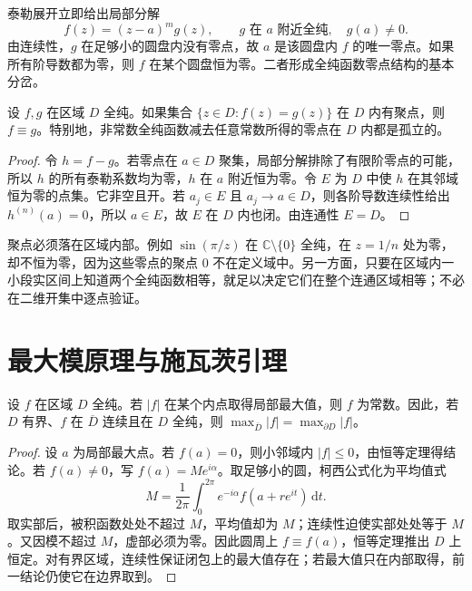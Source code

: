 泰勒展开立即给出局部分解
\begin{equation}
 f(z)=(z-a)^m g(z),\qquad g\text{ 在 }a\text{ 附近全纯},\quad g(a)\ne0.
 \label{eq:ca-zero-factor}
\end{equation}
由连续性，$g$ 在足够小的圆盘内没有零点，故 $a$ 是该圆盘内 $f$ 的唯一零点。如果所有阶导数都为零，则 $f$ 在某个圆盘恒为零。二者形成全纯函数零点结构的基本分岔。

\begin{theorem}[恒等定理]
\label{thm:ca-identity}
设 $f,g$ 在区域 $D$ 全纯。如果集合 $\{z\in D:f(z)=g(z)\}$ 在 $D$ 内有聚点，则 $f\equiv g$。特别地，非常数全纯函数减去任意常数所得的零点在 $D$ 内都是孤立的。
\end{theorem}
\begin{proof}
令 $h=f-g$。若零点在 $a\in D$ 聚集，局部分解排除了有限阶零点的可能，所以 $h$ 的所有泰勒系数均为零，$h$ 在 $a$ 附近恒为零。令 $E$ 为 $D$ 中使 $h$ 在其邻域恒为零的点集。它非空且开。若 $a_j\in E$ 且 $a_j\to a\in D$，则各阶导数连续性给出 $h^{(n)}(a)=0$，所以 $a\in E$，故 $E$ 在 $D$ 内也闭。由连通性 $E=D$。
\end{proof}

聚点必须落在区域内部。例如 $\sin(\pi/z)$ 在 $\mathbb C\setminus\{0\}$ 全纯，在 $z=1/n$ 处为零，却不恒为零，因为这些零点的聚点 $0$ 不在定义域中。另一方面，只要在区域内一小段实区间上知道两个全纯函数相等，就足以决定它们在整个连通区域相等；不必在二维开集中逐点验证。

\section{最大模原理与施瓦茨引理}

\begin{theorem}[最大模原理]
\label{thm:ca-maximum}
设 $f$ 在区域 $D$ 全纯。若 $|f|$ 在某个内点取得局部最大值，则 $f$ 为常数。因此，若 $D$ 有界、$f$ 在 $\overline D$ 连续且在 $D$ 全纯，则 $\max_{\overline D}|f|=\max_{\partial D}|f|$。
\end{theorem}
\begin{proof}
设 $a$ 为局部最大点。若 $f(a)=0$，则小邻域内 $|f|\le0$，由恒等定理得结论。若 $f(a)\ne0$，写 $f(a)=Me^{i\alpha}$。取足够小的圆，柯西公式化为平均值式
\[
 M=\frac1{2\pi}\int_0^{2\pi}e^{-i\alpha}f(a+re^{it})\,\mathrm dt.
\]
取实部后，被积函数处处不超过 $M$，平均值却为 $M$；连续性迫使实部处处等于 $M$。又因模不超过 $M$，虚部必须为零。因此圆周上 $f\equiv f(a)$，恒等定理推出 $D$ 上恒定。对有界区域，连续性保证闭包上的最大值存在；若最大值只在内部取得，前一结论仍使它在边界取到。
\end{proof}

